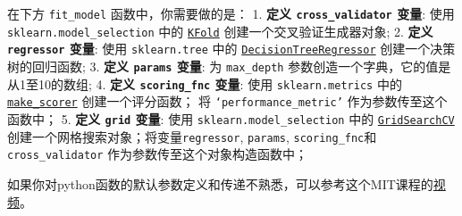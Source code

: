 \documentclass[11pt]{article}
\begin{document}
在下方 \texttt{fit\_model} 函数中，你需要做的是： 1. \textbf{定义
\texttt{\textquotesingle{}cross\_validator\textquotesingle{}} 变量}:
使用 \texttt{sklearn.model\_selection} 中的
\href{http://scikit-learn.org/stable/modules/generated/sklearn.model_selection.KFold.html}{\texttt{KFold}}
创建一个交叉验证生成器对象; 2. \textbf{定义
\texttt{\textquotesingle{}regressor\textquotesingle{}} 变量}: 使用
\texttt{sklearn.tree} 中的
\href{http://scikit-learn.org/stable/modules/generated/sklearn.tree.DecisionTreeRegressor.html}{\texttt{DecisionTreeRegressor}}
创建一个决策树的回归函数; 3. \textbf{定义
\texttt{\textquotesingle{}params\textquotesingle{}} 变量}: 为
\texttt{\textquotesingle{}max\_depth\textquotesingle{}}
参数创造一个字典，它的值是从1至10的数组; 4. \textbf{定义
\texttt{\textquotesingle{}scoring\_fnc\textquotesingle{}} 变量}: 使用
\texttt{sklearn.metrics} 中的
\href{http://scikit-learn.org/stable/modules/generated/sklearn.metrics.make_scorer.html}{\texttt{make\_scorer}}
创建一个评分函数； 将 \texttt{‘performance\_metric’}
作为参数传至这个函数中； 5. \textbf{定义
\texttt{\textquotesingle{}grid\textquotesingle{}} 变量}: 使用
\texttt{sklearn.model\_selection} 中的
\href{http://scikit-learn.org/stable/modules/generated/sklearn.model_selection.GridSearchCV.html}{\texttt{GridSearchCV}}
创建一个网格搜索对象；将变量\texttt{\textquotesingle{}regressor\textquotesingle{}},
\texttt{\textquotesingle{}params\textquotesingle{}},
\texttt{\textquotesingle{}scoring\_fnc\textquotesingle{}}和
\texttt{\textquotesingle{}cross\_validator\textquotesingle{}}
作为参数传至这个对象构造函数中；

如果你对python函数的默认参数定义和传递不熟悉，可以参考这个MIT课程的\href{http://cn-static.udacity.com/mlnd/videos/MIT600XXT114-V004200_DTH.mp4}{视频}。
\end{document}
